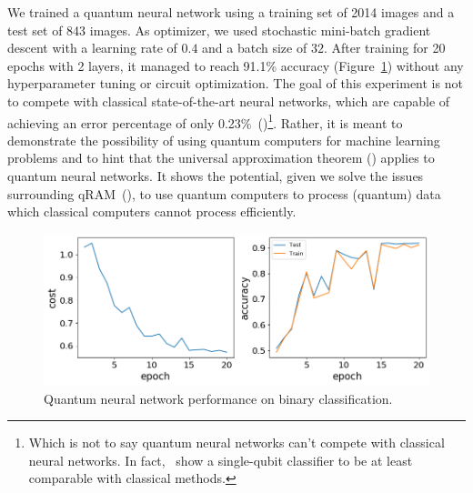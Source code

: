 \documentclass[a4paper,10pt]{article}
\begin{document}
We trained a quantum neural network using a training set of 2014 images and a test set of 843 images.
As optimizer, we used stochastic mini-batch gradient descent with a learning rate of $0.4$ and a batch size of $32$.
After training for 20 epochs with 2 layers, it managed to reach 91.1\% accuracy (Figure~\ref{fig:bdc-performance}) without any hyperparameter tuning or circuit optimization.
The goal of this experiment is not to compete with classical state-of-the-art neural networks, which are capable of achieving an error percentage of only 0.23\%~(\cite{cirecsan2012multi})\footnote{Which is not to say quantum neural networks can't compete with classical neural networks. In fact,~\cite{perez2019data} show a single-qubit classifier to be at least comparable with classical methods.}.
Rather, it is meant to demonstrate the possibility of using quantum computers for machine learning problems and to hint that the universal approximation theorem (\cite{csaji2001approximation}) applies to quantum neural networks.
It shows the potential, given we solve the issues surrounding qRAM~(\cite{aaronson2015read}), to use quantum computers to process (quantum) data which classical computers cannot process efficiently.
\begin{figure}[ht]
	\centering
	\includegraphics[width=.9\linewidth]{figures/downsampled_qnn.png}
	\caption{Quantum neural network performance on binary classification.}
	\label{fig:bdc-performance}
\end{figure}
\end{document}
